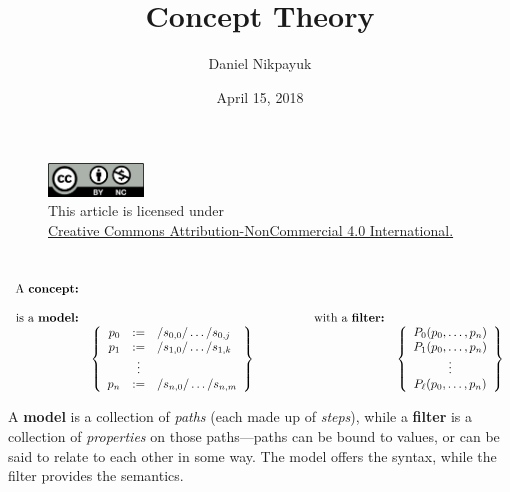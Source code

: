 \documentclass[twoside]{article}
\title{Concept Theory}
\author{Daniel Nikpayuk}
\date{April 15, 2018}
\begin{document}
\maketitle
\thispagestyle{empty}

\begin{figure}[h]
\centering
\includegraphics[width=1in]{../cc-by-nc.png}\\[0.1in]
\tiny This article is licensed under \\
\href{http://creativecommons.org/licenses/by-nc/4.0/}
{Creative Commons Attribution-NonCommercial 4.0 International.}\\[0.3in]
\end{figure}


\ \\[0.5cm]

$$ \begin{array}{rlrl}
 \mbox{A \bfseries concept:}										\\
													\\
 \mbox{is a \bfseries model:}	&			&  \qquad\qquad \mbox{with a \bfseries filter:}	\\
 & \left\{\begin{array}{rcl}
   p_0	& :=		& /s_{0,0}/\ldots/s_{0,j}			\\
   p_1	& :=		& /s_{1,0}/\ldots/s_{1,k}			\\
         & \vdots	& 						\\
   p_n	& :=		& /s_{n,0}/\ldots/s_{n,m}			\\
   \end{array}\right\} && \left\{\begin{array}{c}
   P_0(p_0,\ldots,p_n)							\\
   P_1(p_0,\ldots,p_n)							\\
   \vdots								\\
   P_\ell(p_0,\ldots,p_n)						\\
   \end{array}\right\}
\end{array} $$

A {\bfseries model} is a collection of \emph{paths} (each made up of \emph{steps}), while a {\bfseries filter} is a collection
of \emph{properties} on those paths---paths can be bound to values, or can be said to relate to each other in some way.
The model offers the syntax, while the filter provides the semantics.
\end{document}
